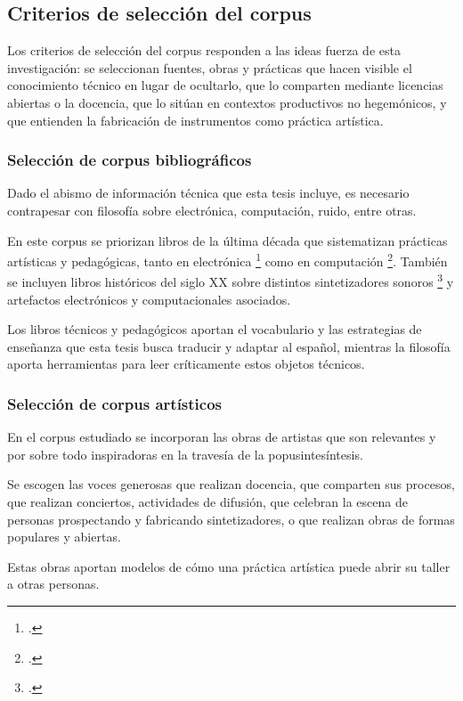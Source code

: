 \documentclass[../candidatura.tex]{subfiles}
\begin{document}
\subsection{Criterios de selección del corpus}

Los criterios de selección del corpus responden a las ideas fuerza de esta investigación: se seleccionan fuentes, obras y prácticas que hacen visible el conocimiento técnico en lugar de ocultarlo, que lo comparten mediante licencias abiertas o la docencia, que lo sitúan en contextos productivos no hegemónicos, y que entienden la fabricación de instrumentos como práctica artística.

\subsubsection{Selección de corpus bibliográficos}

Dado el abismo de información técnica que esta tesis incluye, es necesario contrapesar con filosofía sobre electrónica, computación, ruido, entre otras.

En este corpus se priorizan libros de la última década que sistematizan prácticas artísticas y pedagógicas, tanto en electrónica \footcite{pearson_electronic_2024} como en computación \footcite{erwig_erase_2025}. También se incluyen libros históricos del siglo XX sobre distintos sintetizadores sonoros \footcite{pinch_analog_2002} y artefactos electrónicos y computacionales asociados.

Los libros técnicos y pedagógicos aportan el vocabulario y las estrategias de enseñanza que esta tesis busca traducir y adaptar al español, mientras la filosofía aporta herramientas para leer críticamente estos objetos técnicos.

\subsubsection{Selección de corpus artísticos}

En el corpus estudiado se incorporan las obras de artistas que son relevantes y por sobre todo inspiradoras en la travesía de la popusintesíntesis.

Se escogen las voces generosas que realizan docencia, que comparten sus procesos, que realizan conciertos, actividades de difusión, que celebran la escena de personas prospectando y fabricando sintetizadores, o que realizan obras de formas populares y abiertas.

Estas obras aportan modelos de cómo una práctica artística puede abrir su taller a otras personas.
\end{document}
